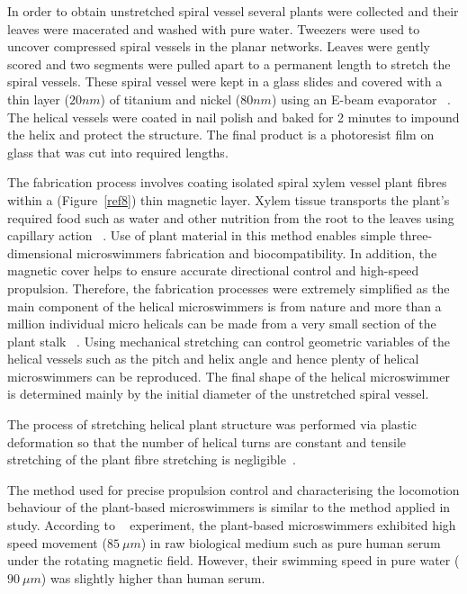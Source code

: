 \documentclass[12pt,a4paper,titlepage]{report}
\begin{document}
In order to obtain unstretched spiral vessel several plants were collected and their leaves were 
macerated and washed with pure water. Tweezers were used to uncover compressed spiral vessels 
in the planar networks. Leaves were gently scored and two segments were pulled apart to a permanent
 length to stretch the spiral vessels. These spiral vessel were kept in a glass slides and covered with a 
thin layer ($20 nm$) of titanium and nickel ($80 nm$) using an 
E-beam evaporator ~\citep{mahoney2011velocity}. The helical vessels were coated in nail 
polish and baked for 2 minutes to impound the helix and protect the structure. The final product is 
a photoresist film on glass that was cut into required lengths.      
  

The fabrication process involves coating isolated spiral xylem vessel plant fibres within a (Figure~\ref{ref8})
thin magnetic layer. Xylem tissue transports the plant\rq{}s required food such as water and other 
nutrition from the root to the leaves using capillary action ~\citep{mahoney2011velocity}.
Use of plant material in this method enables simple three-dimensional microswimmers fabrication 
and biocompatibility. In addition, the magnetic cover helps to ensure accurate directional control and 
high-speed propulsion. Therefore, the fabrication processes were extremely simplified as the main 
component of the helical microswimmers is from nature and more than a million individual micro helicals 
can be made from a very small section of the plant stalk ~\citep{mahoney2011velocity}. Using mechanical stretching can control geometric variables of the helical vessels such as the pitch and
 helix angle and hence plenty of helical microswimmers can be reproduced. The final shape of the 
helical microswimmer is determined mainly by the initial diameter of the unstretched spiral vessel.




The process of stretching helical plant structure was performed via plastic deformation so that the number 
of helical turns are constant and tensile stretching of the plant fibre stretching is negligible~\citep{mahoney2011velocity}. 


The method used for precise propulsion control and characterising the locomotion behaviour of the 
plant-based microswimmers is similar to the method applied in \citeauthor{gao2013bioinspired} study.
According to \citeauthor{gao2013bioinspired} ~\citep{gao2013bioinspired} experiment, the plant-based 
microswimmers exhibited high speed movement ($85~\mu m$) in raw biological medium such as 
pure human serum under the rotating magnetic field. However, their swimming speed in pure water
 ($90~\mu m$) was slightly higher than human serum.   
\end{document}
